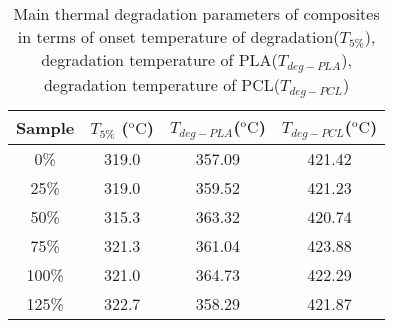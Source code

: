 \documentclass{Head}
\begin{document}
\begin{table}
    \caption{Main thermal degradation parameters of composites in terms of onset temperature of degradation($T_{5\%}$), degradation temperature of PLA($T_{deg-PLA}$), degradation temperature of PCL($T_{deg-PCL}$)}
    \begin{tabular}{cccc}
        \toprule
        Sample & $T_{5\%}$ ($\mathrm{^o C}$) & $T_{deg-PLA}$($\mathrm{^o C}$) & $T_{deg-PCL}$($\mathrm{^o C}$) \\
        \midrule
        0\%    & 319.0                       & 357.09                         & 421.42                         \\
        25\%   & 319.0                       & 359.52                         & 421.23                         \\
        50\%   & 315.3                       & 363.32                         & 420.74                         \\
        75\%   & 321.3                       & 361.04                         & 423.88                         \\
        100\%  & 321.0                       & 364.73                         & 422.29                         \\
        125\%  & 322.7                       & 358.29                         & 421.87                         \\
        \bottomrule
    \end{tabular}
\end{table}
\end{document}
